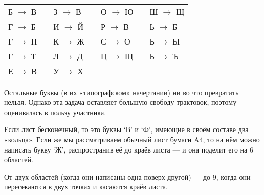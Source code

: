 \begin{itemize}

\def\ltr#1{`#1'}

\itA \ 

\begin{center}\begin{tabular}{lllllll}
	Б $\longrightarrow$ В & \quad & З $\longrightarrow$ В & & О $\longrightarrow$ Ю & & Ш $\longrightarrow$ Щ \\
	Г $\longrightarrow$ Б & & И $\longrightarrow$ Й & \quad & Р $\longrightarrow$ В & & Ь $\longrightarrow$ Б \\
	Г $\longrightarrow$ П & & К $\longrightarrow$ Ж & & С $\longrightarrow$ О & \quad & Ь $\longrightarrow$ Ы \\
	Г $\longrightarrow$ Т & & Л $\longrightarrow$ Д & & Ц $\longrightarrow$ Щ & & Ь $\longrightarrow$ Ъ \\
	Е $\longrightarrow$ В & & У $\longrightarrow$ Х
\end{tabular}\end{center}

Остальные буквы (в их «типографском» начертании) ни во что превратить нельзя. Однако эта задача оставляет большую свободу трактовок, поэтому оценивалась в пользу участника.

\itB Если лист бесконечный, то это буквы \ltr В и \ltr Ф, имеющие в своём составе два «кольца». Если же мы рассматриваем обычный лист бумаги A4, то на нём можно написать букву \ltr Ж, распространив её до краёв листа — и она поделит его на 6 областей.

\itC От двух областей (когда они написаны одна поверх другой) — до 9, когда они пересекаются в двух точках и касаются краёв листа.
\end{itemize}